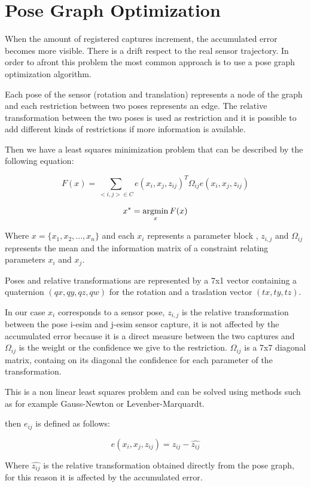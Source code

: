 \section{Pose Graph Optimization}

When the amount of registered captures increment, the accumulated error 
becomes more visible. There is a drift respect to the real sensor trajectory. 
In order to afront this problem the most common approach is to use a pose graph 
optimization algorithm. 

Each pose of the sensor (rotation and translation) represents a node of the 
graph and each restriction between two poses represents an edge. The relative 
transformation between the two poses is used as restriction and it is possible 
to add different kinds of restrictions if more information is available.

Then we have a least squares minimization problem that can be described by the following equation:

$$ F(x) = \sum\limits_{<i,j> \in C } e(x_i,x_j,z_{ij})^T \Omega_{ij} e(x_i,x_j,z_{ij}) $$

$$ x^* = \mathop{\rm argmin}_x F(x) $$

Where $x=\{x_1,x_2,...,x_n\}$ and each $x_i$ represents a parameter block , $z_{i,j}$ and $\Omega_{ij}$ represents the mean  
 and the information matrix  of a constraint 
relating parameters $x_i$ and $x_j$.

Poses and relative transformations are represented by a 7x1 vector containing a quaternion $(qx,qy,qz,qw)$ 
for the rotation and a traslation vector $(tx,ty,tz)$.

In our case $x_i$ corresponds to a sensor pose, $z_{i,j}$ is the 
relative transformation between the pose i-esim and j-esim sensor capture, it is not affected by the accumulated error 
because it is a direct measure between the two captures and $\Omega_{ij}$ is the weight or 
the confidence we give to the restriction. $\Omega_{ij}$ is a 7x7 diagonal matrix, containg on its diagonal the confidence for each 
parameter of the transformation.

This is a non linear least squares problem and can be solved using 
methods such as for example Gauss-Newton or Levenber-Marquardt.


then $e_{ij}$ is defined as follows:

$$
e(x_i,x_j,z_{ij}) = z_{ij} - \hat{z_{ij}}
$$

Where $\hat{z_{ij}}$ is the relative transformation obtained directly from the pose graph, for this reason 
it is affected by the accumulated error.


